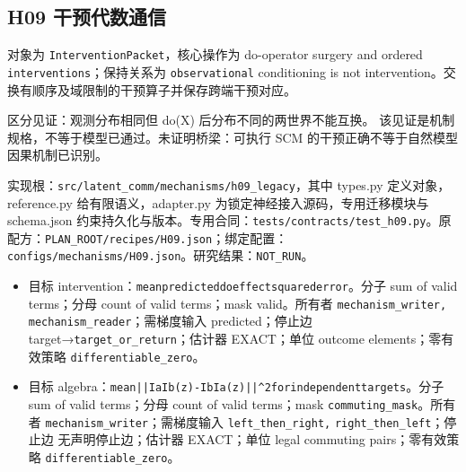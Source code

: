 \documentclass[
  10pt,
]{article}
\begin{document}
\subsection{H09
干预代数通信}\label{h09-ux5e72ux9884ux4ee3ux6570ux901aux4fe1}

对象为 \nolinkurl{InterventionPacket}，核心操作为 do-operator surgery
and ordered \nolinkurl{interventions}；保持关系为
\nolinkurl{observational} conditioning is not
intervention。交换有顺序及域限制的干预算子并保存跨端干预对应。

区分见证：观测分布相同但 do(X) 后分布不同的两世界不能互换。
该见证是机制规格，不等于模型已通过。未证明桥梁：可执行 SCM
的干预正确不等于自然模型因果机制已识别。

实现根：{\small\nolinkurl{src/latent_comm/mechanisms/h09_legacy}}，其中
types.py 定义对象，reference.py 给有限语义，adapter.py
为锁定神经接入源码，专用迁移模块与 schema.json
约束持久化与版本。专用合同：{\small\nolinkurl{tests/contracts/test_h09.py}}。原配方：{\small\nolinkurl{PLAN_ROOT/recipes/H09.json}}；绑定配置：{\small\nolinkurl{configs/mechanisms/H09.json}}。研究结果：\nolinkurl{NOT_RUN}。

\begin{itemize}
\item
  目标
  intervention：{\small\nolinkurl{mean}\hspace{0.333em}\nolinkurl{predicted}\hspace{0.333em}\nolinkurl{do}\hspace{0.333em}\nolinkurl{effect}\hspace{0.333em}\nolinkurl{squared}\hspace{0.333em}\nolinkurl{error}}。分子
  sum of valid terms；分母 count of valid terms；mask valid。所有者
  \nolinkurl{mechanism_writer,} \nolinkurl{mechanism_reader}；需梯度输入
  predicted；停止边 target→\nolinkurl{target_or_return}；估计器
  EXACT；单位 outcome elements；零有效策略
  \nolinkurl{differentiable_zero}。
\item
  目标
  algebra：{\small\nolinkurl{mean}\hspace{0.333em}\nolinkurl{||IaIb(z)-IbIa(z)||^2}\hspace{0.333em}\nolinkurl{for}\hspace{0.333em}\nolinkurl{independent}\hspace{0.333em}\nolinkurl{targets}}。分子
  sum of valid terms；分母 count of valid terms；mask
  \nolinkurl{commuting_mask}。所有者
  \nolinkurl{mechanism_writer}；需梯度输入 \nolinkurl{left_then_right,}
  \nolinkurl{right_then_left}；停止边 无声明停止边；估计器 EXACT；单位
  legal commuting pairs；零有效策略 \nolinkurl{differentiable_zero}。
\end{itemize}
\end{document}
